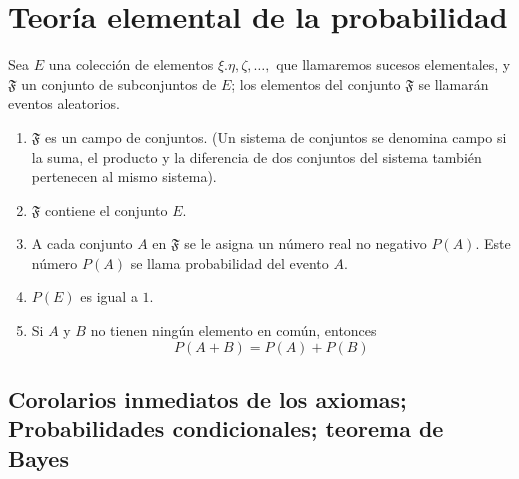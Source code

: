 \chapter{Teoría elemental de la probabilidad}

\begin{tcolorbox}[colframe=white]
    \begin{axioma} Sea $E$ una colección de elementos $\xi.\eta,\zeta,\ldots,$ que llamaremos sucesos elementales, y $\mathfrak{F}$ un conjunto de subconjuntos de $E$; los elementos del conjunto $\mathfrak{F}$ se llamarán eventos aleatorios.

	\begin{enumerate}[\bfseries I.]

	    \item $\mathfrak{F}$ es un campo de conjuntos. (Un sistema de conjuntos se denomina campo si la suma, el producto y la diferencia de dos conjuntos del sistema también pertenecen al mismo sistema).

	    \item $\mathfrak{F}$ contiene el conjunto $E$.

	    \item A cada conjunto $A$ en $\mathfrak{F}$ se le asigna un número real no negativo $P(A)$. Este número $P(A)$ se llama probabilidad del evento $A$.

	    \item $P(E)$ es igual a $1$.

	    \item Si $A$ y $B$ no tienen ningún elemento en común, entonces $$P(A+B)=P(A)+P(B)$$

	\end{enumerate}
    \end{axioma}
\end{tcolorbox}

\setcounter{section}{3}
\section{Corolarios inmediatos de los axiomas; Probabilidades condicionales; teorema de Bayes}
